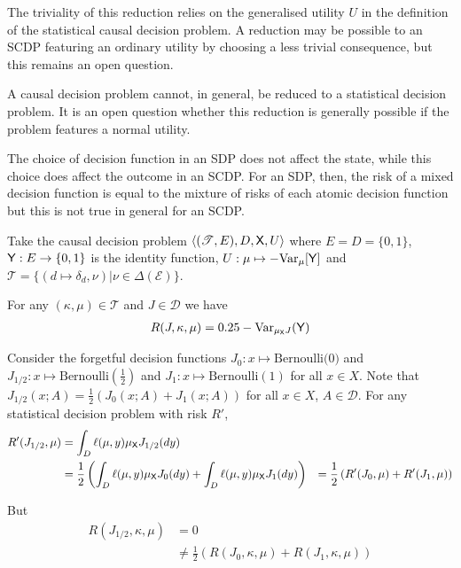The triviality of this reduction relies on the generalised utility $U$ in the definition of the statistical causal decision problem. A reduction may be possible to an SCDP featuring an ordinary utility by choosing a less trivial consequence, but this remains an open question.

A causal decision problem cannot, in general, be reduced to a statistical decision problem. It is an open question whether this reduction is generally possible if the problem features a normal utility.

\begin{example}
The choice of decision function in an SDP does not affect the state, while this choice does affect the outcome in an SCDP. For an SDP, then, the risk of a mixed decision function is equal to the mixture of risks of each atomic decision function but this is not true in general for an SCDP.

Take the causal decision problem $\langle (\mathscr{T}, E), D, \mathsf{X}, U \rangle$ where $E=D=\{0,1\}$, $\mathsf{Y}:E\to \{0,1\}$ is the identity function, $U:\mu\mapsto -\text{Var}_\mu[\mathsf{Y}]$ and $\mathscr{T}=\{(d\mapsto \delta_d,\nu)|\nu\in \Delta(\mathcal{E})\}$.

For any $(\kappa,\mu)\in \mathscr{T}$ and $J\in\mathscr{D}$ we have
\begin{align}
    R(J,\kappa,\mu) = 0.25-\text{Var}_{\mu_{\mathsf{X}} J}(\mathsf{Y})
\end{align}

Consider the forgetful decision functions $J_0:x\mapsto \text{Bernoulli(0)}$ and $J_{1/2}:x\mapsto \mathrm{Bernoulli(\tfrac{1}{2})}$ and $J_1:x\mapsto \mathrm{Bernoulli(1)}$ for all $x\in X$. Note that $J_{1/2}(x;A) = \tfrac{1}{2}(J_0(x;A)+J_1(x;A))$ for all $x\in X$, $A\in \mathcal{D}$. For any statistical decision problem with risk $R'$,
\begin{align}
    R'(J_{1/2},\mu) &= \int_D \ell(\mu,y) \mu_{\mathsf{X}} J_{1/2}(dy)\\
                    &= \frac{1}{2}\left(\int_D \ell(\mu,y) \mu_{\mathsf{X}} J_{0}(dy) + \int_D \ell(\mu,y) \mu_{\mathsf{X}} J_{1}(dy)\right)
                    &= \frac{1}{2}\left(R'(J_0,\mu) + R'(J_1,\mu) \right)
\end{align}

But
\begin{align}
    R(J_{1/2},\kappa,\mu) &= 0\\
                          &\neq \frac{1}{2}\left(R(J_0,\kappa,\mu) + R(J_1,\kappa,\mu)\right)
\end{align}

\end{example}

